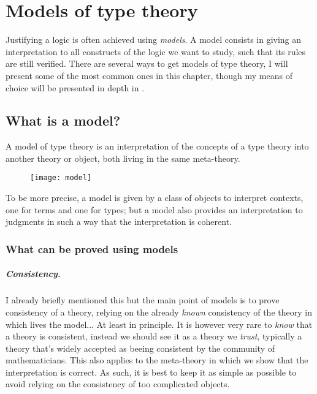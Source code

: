 \chapter{Models of type theory}

Justifying a logic is often achieved using \emph{models}. A model consists
in giving an interpretation to all constructs of the logic we want to study,
such that its rules are still verified.
There are several ways to get models of type theory, I will present some of the
most common ones in this chapter, though my means of choice will be presented in
depth in .

\section{What is a model?}

A model of type theory is an interpretation of the concepts of a type theory
into another theory or object, both living in the same meta-theory.
\begin{figure}[hb]
  \texttt{[image: model]}
\end{figure}
To be more precise, a model is given by a class of objects to interpret
contexts, one for terms and one for types; but a model also provides an
interpretation to judgments in such a way that the interpretation is coherent.

\subsection{What can be proved using models}

\paragraph{Consistency.}

I already briefly mentioned this but the main point of models is to prove
consistency of a theory, relying on the already \emph{known} consistency of the
theory in which lives the model... At least in principle. It is however very
rare to
\emph{know} that a theory is consistent, instead we should see it as a theory we
\emph{trust}, typically a theory that's widely accepted as beeing consistent by
the community of mathematicians.
This also applies to the meta-theory in which we show that the interpretation is
correct. As such, it is best to keep it as simple as possible to avoid relying
on the consistency of too complicated objects.

